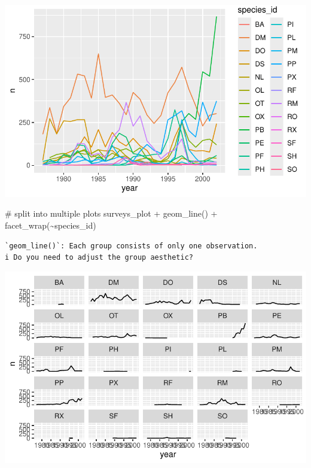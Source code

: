 \documentclass[
  letterpaper,
  DIV=11,
  numbers=noendperiod]{scrreprt}
\newenvironment{Shaded}{\begin{snugshade}}{\end{snugshade}}
\newcommand{\CommentTok}[1]{\textcolor[rgb]{0.37,0.37,0.37}{#1}}
\newcommand{\FunctionTok}[1]{\textcolor[rgb]{0.28,0.35,0.67}{#1}}
\newcommand{\NormalTok}[1]{\textcolor[rgb]{0.00,0.23,0.31}{#1}}
\newcommand{\SpecialCharTok}[1]{\textcolor[rgb]{0.37,0.37,0.37}{#1}}
\begin{document}
\includegraphics{src/notebooks/r_files/figure-pdf/unnamed-chunk-51-3.pdf}

\begin{Shaded}
\begin{Highlighting}[]
\CommentTok{\# split into multiple plots}
\NormalTok{surveys\_plot }\SpecialCharTok{+} \FunctionTok{geom\_line}\NormalTok{() }\SpecialCharTok{+} \FunctionTok{facet\_wrap}\NormalTok{(}\SpecialCharTok{\textasciitilde{}}\NormalTok{species\_id)}
\end{Highlighting}
\end{Shaded}

\begin{verbatim}
`geom_line()`: Each group consists of only one observation.
i Do you need to adjust the group aesthetic?
\end{verbatim}

\includegraphics{src/notebooks/r_files/figure-pdf/unnamed-chunk-51-4.pdf}
\end{document}
